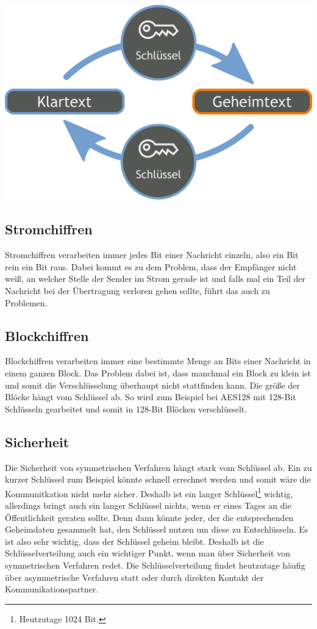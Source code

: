 \documentclass[a4paper,12pt,titlepage]{article}
\begin{document}
\begin{center}
\includegraphics[scale=0.2]{symm_shema.png} %
\end{center}

\subsection{Stromchiffren}
Stromchiffren verarbeiten immer jedes Bit einer Nachricht einzeln, also ein Bit rein ein Bit raus. Dabei kommt es zu dem Problem, dass der Empfänger nicht weiß, an welcher Stelle der Sender im Strom gerade ist und falls mal ein Teil der Nachricht bei der Übertragung verloren gehen sollte, führt das auch zu Problemen.

\subsection{Blockchiffren}
Blockchiffren verarbeiten immer eine bestimmte Menge an Bits einer Nachricht in einem ganzen Block. Das Problem dabei ist, dass manchmal ein Block zu klein ist und somit die Verschlüsselung überhaupt nicht stattfinden kann. Die größe der Blöcke hängt vom Schlüssel ab. So wird zum Beispiel bei AES128 mit 128-Bit Schlüsseln gearbeitet und somit in 128-Bit Blöcken verschlüsselt.

\subsection{Sicherheit}\label{symm:secu}
Die Sicherheit von symmetrischen Verfahren hängt stark vom Schlüssel ab. Ein zu kurzer Schlüssel zum Beispiel könnte schnell errechnet werden und somit wäre die Kommunitkation nicht mehr sicher. Deshalb ist ein langer Schlüssel\footnote{Heutzutage 1024 Bit.} wichtig, allerdings bringt auch ein langer Schlüssel nichts, wenn er eines Tages an die Öffentlichkeit geraten sollte. Denn dann könnte jeder, der die entsprechenden Geheimdaten gesammelt hat, den Schlüssel nutzen um diese zu Entschlüsseln. Es ist also sehr wichtig, dass der Schlüssel geheim bleibt. Deshalb ist die Schlüsselverteilung auch ein wichtiger Punkt, wenn man über Sicherheit von symmetrischen Verfahren redet. Die Schlüsselverteilung findet heutzutage häufig über asymmetrische Verfahren statt oder durch direkten Kontakt der Kommunikationspartner.
\end{document}
